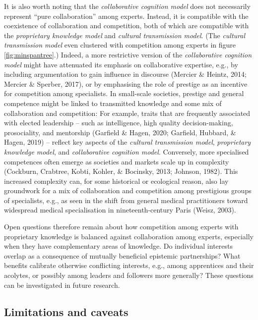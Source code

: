 \documentclass[
  11pt,
]{article}
\begin{document}
It is also worth noting that the \emph{collaborative cognition model} does not necessarily represent ``pure collaboration'' among experts. Instead, it is compatible with the coexistence of collaboration and competition, both of which are compatible with the \emph{proprietary knowledge model} and \emph{cultural transmission model}. (The \emph{cultural transmission model} even clustered with competition among experts in figure \ref{fig:minspantree}.) Indeed, a more restrictive version of the \emph{collaborative cognition model} might have attenuated its emphasis on collaborative expertise, e.g., by including argumentation to gain influence in discourse (Mercier \& Heintz, 2014; Mercier \& Sperber, 2017), or by emphasising the role of prestige as an incentive for competition among specialists. In small-scale societies, prestige and general competence might be linked to transmitted knowledge and some mix of collaboration and competition: For example, traits that are frequently associated with elected leadership -- such as intelligence, high quality decision-making, prosociality, and mentorship (Garfield \& Hagen, 2020; Garfield, Hubbard, \& Hagen, 2019) -- reflect key aspects of the \emph{cultural transmission model}, \emph{proprietary knowledge model}, and \emph{collaborative cognition model}. Conversely, more specialised competences often emerge as societies and markets scale up in complexity (Cockburn, Crabtree, Kobti, Kohler, \& Bocinsky, 2013; Johnson, 1982). This increased complexity can, for some historical or ecological reason, also lay groundwork for a mix of collaboration and competition among prestigious groups of specialists, e.g., as seen in the shift from general medical practitioners toward widespread medical specialisation in nineteenth-century Paris (Weisz, 2003).

Open questions therefore remain about how competition among experts with proprietary knowledge is balanced against collaboration among experts, especially when they have complementary areas of knowledge. Do individual interests overlap as a consequence of mutually beneficial epistemic partnerships? What benefits calibrate otherwise conflicting interests, e.g., among apprentices and their acolytes, or possibly among leaders and followers more generally? These questions can be investigated in future research.

\hypertarget{limitations-and-caveats}{%
\subsection{Limitations and caveats}\label{limitations-and-caveats}}
\end{document}
